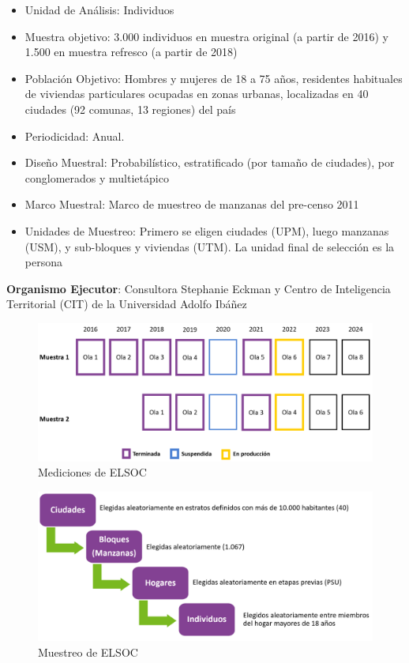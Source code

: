 \documentclass[
  12pt,
]{book}
\begin{document}
\begin{itemize}
\item
  Unidad de Análisis: Individuos
\item
  Muestra objetivo: 3.000 individuos en muestra original (a partir de 2016) y 1.500 en muestra refresco (a partir de 2018)
\item
  Población Objetivo: Hombres y mujeres de 18 a 75 años, residentes habituales de viviendas particulares ocupadas en zonas urbanas, localizadas en 40 ciudades (92 comunas, 13 regiones) del país
\item
  Periodicidad: Anual.
\item
  Diseño Muestral: Probabilístico, estratificado (por tamaño de ciudades), por conglomerados y multietápico
\item
  Marco Muestral: Marco de muestreo de manzanas del pre-censo 2011
\item
  Unidades de Muestreo: Primero se eligen ciudades (UPM), luego manzanas (USM), y sub-bloques y viviendas (UTM). La unidad final de selección es la persona
\end{itemize}

\textbf{Organismo Ejecutor}: Consultora Stephanie Eckman y Centro de Inteligencia Territorial (CIT) de la Universidad Adolfo Ibáñez

\begin{figure}

{\centering \includegraphics[width=1\linewidth,height=1\textheight]{imagenes/olas_elsoc} 

}

\caption{Mediciones de ELSOC}\label{fig:ilust-olas-elsoc}
\end{figure}

\begin{figure}

{\centering \includegraphics[width=1\linewidth,height=1\textheight]{imagenes/etapas_seleccion} 

}

\caption{Muestreo de ELSOC}\label{fig:ilust-etapas-seleccion}
\end{figure}
\end{document}
